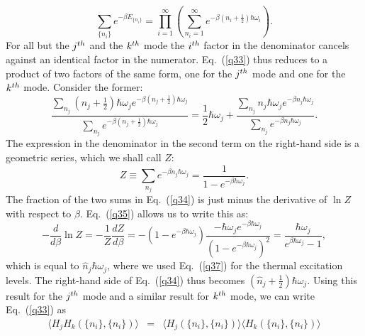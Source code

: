 \documentclass{elsart}
\begin{document}
{\begin{equation}
\sum_{ \{ n_{i} \}  } e^{ \displaystyle{ -\beta E_{ \{ n_{i} \} } } } 
= \prod_{i=1}^\infty \left( \sum_{n_i = 1}^\infty 
e^{ \displaystyle{ -\beta  \left(n_{i}+\frac{1}{2}\right)\hbar\omega_{i} } } \right).
\label{q33a}
\end{equation}
For all but the $j^{\rm th}$ and the $k^{\rm th}$ mode the $i^{\rm th}$  factor in the denominator cancels against an identical factor in the numerator. Eq.\ (\ref{q33}) thus reduces to a product of two factors of the same form, one for the $j^{\rm th}$ mode and one for the $k^{\rm th}$ mode. Consider the former:
\begin{equation}
\frac{ \displaystyle{ \sum_{n_{j}} }
\left(n_{j}+ \displaystyle{ \frac{1}{2}} \right)\hbar\omega_{j}
e^{-\beta(n_{j}+\frac{1}{2})\hbar\omega_{j}}}{\displaystyle {\sum_{n_{j}}}e^{-\beta (n_{j}+\frac{1}{2}) \hbar\omega_{j}}} = \frac{1}{2} \hbar \omega_j + 
\frac{ \displaystyle{ \sum_{n_{j}} }
n_{j} \hbar\omega_{j}
e^{-\beta n_{j}\hbar\omega_{j}}}{\displaystyle{\sum_{n_{j}}}e^{-\beta n_{j} \hbar\omega_{j}}}.
\label{q34}
\end{equation}
The expression in the denominator in the second term on the right-hand side is a geometric series, which we shall call $Z$:
\begin{equation}
Z \equiv  \displaystyle{\sum_{n_{j}}}e^{-\beta n_{j} \hbar\omega_{j}} = \frac{1}{1 - e^{-\beta \hbar\omega_j }}.
\label{q35}
\end{equation}
The fraction of the two sums in Eq.\ (\ref{q34}) is just minus the derivative of $\ln Z$ with respect to $\beta$. Eq.\ (\ref{q35}) allows us to write this as:
\begin{equation}
- \frac{d}{d\beta} \ln Z = - \frac{1}{Z} \frac{dZ}{d\beta} = 
- \left( 1 - e^{-\beta \hbar\omega_j} \right) \frac{- \hbar \omega_j e^{-\beta \hbar\omega_j} }{
\left( 1 - e^{-\beta \hbar\omega_j} \right)^2 } = \frac{ \hbar \omega_j}{ e^{\beta \hbar\omega_j} -1},
\label{q36}
\end{equation}
which is equal to $\hat{n}_j \hbar \omega_j$, where we used Eq.\ (\ref{q37}) for the thermal excitation levels. The right-hand side of Eq.\ (\ref{q34}) thus becomes $\left( \hat{n}_j + \frac{1}{2} \right) \hbar \omega_j$. Using this result for the $j^{\rm th}$ mode and a similar result for $k^{\rm th}$ mode, we can write Eq.\ (\ref{q33}) as
\begin{eqnarray}
\langle H_j H_k (\{ n_i \}, \{ n_i \}) \rangle & = & \langle H_j (\{ n_i \}, \{ n_i \}) \rangle
\langle H_k (\{ n_i \}, \{ n_i \}) \rangle
\nonumber \\

\end{eqnarray}}
\end{document}

